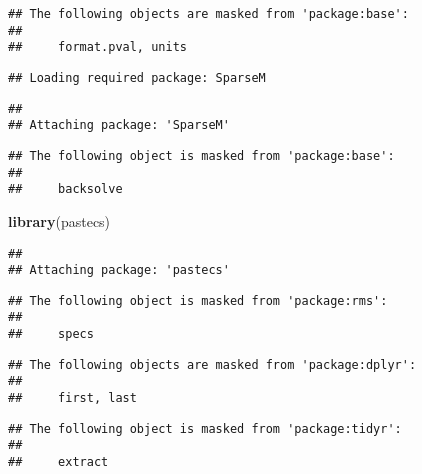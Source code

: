 \documentclass[]{article}
\newenvironment{Shaded}{\begin{snugshade}}{\end{snugshade}}
\newcommand{\KeywordTok}[1]{\textcolor[rgb]{0.13,0.29,0.53}{\textbf{#1}}}
\newcommand{\DataTypeTok}[1]{\textcolor[rgb]{0.13,0.29,0.53}{#1}}
\newcommand{\StringTok}[1]{\textcolor[rgb]{0.31,0.60,0.02}{#1}}
\newcommand{\OperatorTok}[1]{\textcolor[rgb]{0.81,0.36,0.00}{\textbf{#1}}}
\newcommand{\NormalTok}[1]{#1}
\begin{document}
\begin{verbatim}
## The following objects are masked from 'package:base':
## 
##     format.pval, units
\end{verbatim}

\begin{verbatim}
## Loading required package: SparseM
\end{verbatim}

\begin{verbatim}
## 
## Attaching package: 'SparseM'
\end{verbatim}

\begin{verbatim}
## The following object is masked from 'package:base':
## 
##     backsolve
\end{verbatim}

\begin{Shaded}
\begin{Highlighting}[]
\KeywordTok{library}\NormalTok{(pastecs)}
\end{Highlighting}
\end{Shaded}

\begin{verbatim}
## 
## Attaching package: 'pastecs'
\end{verbatim}

\begin{verbatim}
## The following object is masked from 'package:rms':
## 
##     specs
\end{verbatim}

\begin{verbatim}
## The following objects are masked from 'package:dplyr':
## 
##     first, last
\end{verbatim}

\begin{verbatim}
## The following object is masked from 'package:tidyr':
## 
##     extract
\end{verbatim}

\begin{Shaded}
\end{Shaded}
\end{document}
